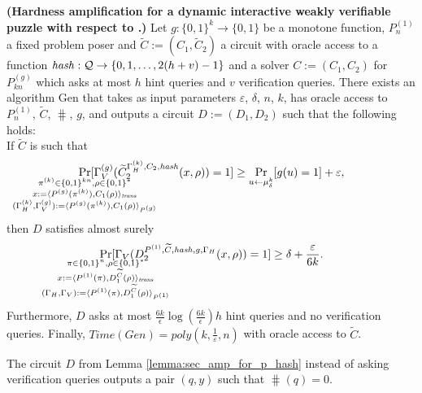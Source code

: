 \begin{lemma}\textbf{(Hardness amplification for a dynamic interactive weakly verifiable puzzle with respect to \boldmath{$\hash$}.)}
  \label{lemma:sec_amp_for_p_hash}
  Let $g: \{0,1\}^{k} \rightarrow \{0,1\}$ be a monotone function, $P_n^{(1)}$ a fixed
  problem poser and $\widetilde{C} := (C_1, \widetilde{C}_2)$ a circuit
  with oracle access to a function $\operatorname{\mathit{hash}}: \mathcal{Q} \rightarrow \{0,1,\dots, 2(h+v)-1\}$
  and a solver $C := (C_1, C_2)$ for $P_{kn}^{(g)}$ which asks at most $h$ hint queries and $v$ verification queries.
  There exists an algorithm Gen that takes as input parameters $\varepsilon$, $\delta$, $n$, $k$,
  has oracle access to $P_n^{(1)}$,  $\widetilde{C}$, $\hash$, $g$,
  and outputs a circuit $D := (D_1, D_2)$ such that the following holds: \\
  If $\widetilde{C}$ is such that
  \begin{align*}
    \underset{\mathclap{\substack{
          \pi^{(k)} \in \{0,1\}^{kn}, \rho \in \{0,1\}^{*} \\
          x:= \langle P^{(g)}(\pi^{(k)}), {C}_1(\rho) \rangle_{\mathit{trans}} \\
          (\Gamma_H^{(k)}, \Gamma_V^{(g)}) := \langle P^{(g)}(\pi^{(k)}), C_1(\rho) \rangle_{P^{(g)}}}}}
    {\Pr}[\Gamma_V^{(g)}(\widetilde{C}_2^{\Gamma_H^{(k)}, C_2, \hash}(x,\rho)) = 1]
    \geq \underset{u \leftarrow \mu_\delta^k}{\Pr}[g(u) = 1] + \varepsilon,
  \end{align*}
  then $D$ satisfies almost surely
  \begin{align*}
    \underset{
      \mathclap{
      \substack{
        \pi \in \{0,1\}^{n}, \rho \in \{0,1\}^{*} \\
        x := \langle P^{(1)}(\pi), D_1^{\widetilde{C}}(\rho) \rangle_{\mathit{trans}} \\
        (\Gamma_H, \Gamma_V) := \langle P^{(1)}(\pi), D_1^{\widetilde{C}}(\rho) \rangle_{P^{(1)}}}}}
    {\Pr}[\Gamma_V(D_2^{P^{(1)}, \widetilde{C}, \hash, g, \Gamma_H}(x, \rho)) = 1] \geq \delta + \frac{\varepsilon}{6k}.
  \end{align*}
  Furthermore, $D$
  asks at most $\frac{6k}{\epsilon}\log\left(\frac{6k}{\epsilon}\right) h$ hint queries and no verification queries.
  Finally, $\mathit{Time}(\mathit{Gen}) = \mathit{poly}(k, \frac{1}{\varepsilon}, n)$ with oracle access to $\widetilde{C}$.
\end{lemma}
The circuit $D$ from Lemma \ref{lemma:sec_amp_for_p_hash} instead of asking verification queries outputs a pair $(q, y)$
such that $\hash(q) = 0$.


